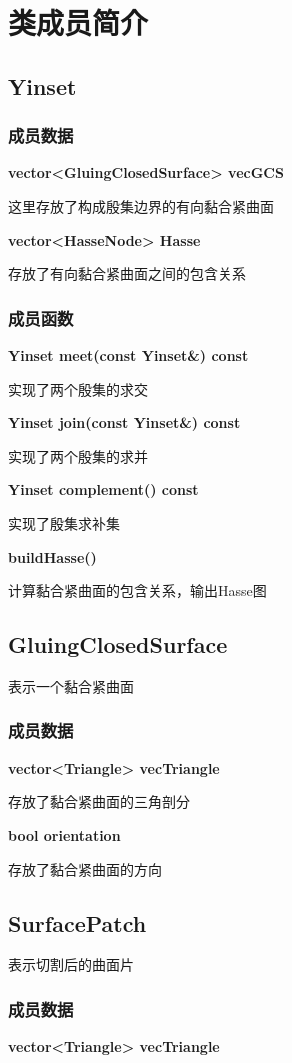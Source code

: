 \documentclass[UTF8]{ctexart}
\begin{document}
\chapter{类成员简介}
	\section{Yinset}
	\subsection{成员数据}
	\textbf{vector<GluingClosedSurface> vecGCS}
	
	这里存放了构成殷集边界的有向黏合紧曲面
	
	\textbf{vector<HasseNode> Hasse}
	
	存放了有向黏合紧曲面之间的包含关系
	\subsection{成员函数}
	\textbf{Yinset meet(const Yinset\&) const}
	
	实现了两个殷集的求交
	
	\textbf{Yinset join(const Yinset\&) const}
	
	实现了两个殷集的求并
	
	\textbf{Yinset complement() const}
	
	实现了殷集求补集
	
	\textbf{buildHasse()}
	
	计算黏合紧曲面的包含关系，输出Hasse图
	
	
	\section{GluingClosedSurface}
	表示一个黏合紧曲面
	
	\subsection{成员数据}
	\textbf{vector<Triangle> vecTriangle}
	
	存放了黏合紧曲面的三角剖分
	
	\textbf{bool orientation}
	
	存放了黏合紧曲面的方向
	
	\section{SurfacePatch}
	表示切割后的曲面片
	
	\subsection{成员数据}
	\textbf{vector<Triangle> vecTriangle}
	
\end{document}

